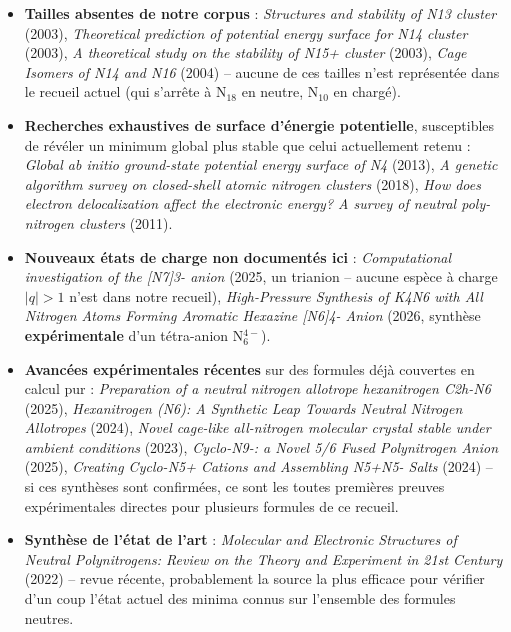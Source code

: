 \documentclass[11pt,a4paper]{article}
\begin{document}
\begin{itemize}
  \item \textbf{Tailles absentes de notre corpus} : \emph{Structures and
  stability of N13 cluster} (2003), \emph{Theoretical prediction of
  potential energy surface for N14 cluster} (2003), \emph{A theoretical
  study on the stability of N15+ cluster} (2003), \emph{Cage Isomers of
  N14 and N16} (2004) -- aucune de ces tailles n'est repr\'esent\'ee dans
  le recueil actuel (qui s'arr\^ete \`a N$_{18}$ en neutre, N$_{10}$ en
  charg\'e).
  \item \textbf{Recherches exhaustives de surface d'\'energie
  potentielle}, susceptibles de r\'ev\'eler un minimum global plus stable
  que celui actuellement retenu : \emph{Global ab initio ground-state
  potential energy surface of N4} (2013), \emph{A genetic algorithm survey
  on closed-shell atomic nitrogen clusters} (2018), \emph{How does electron
  delocalization affect the electronic energy? A survey of neutral
  poly-nitrogen clusters} (2011).
  \item \textbf{Nouveaux \'etats de charge non document\'es ici} :
  \emph{Computational investigation of the [N7]3- anion} (2025, un trianion
  --  aucune esp\`ece \`a charge $|q|>1$ n'est dans notre recueil),
  \emph{High-Pressure Synthesis of K4N6 with All Nitrogen Atoms Forming
  Aromatic Hexazine [N6]4- Anion} (2026, synth\`ese \textbf{exp\'erimentale}
  d'un t\'etra-anion N$_6^{4-}$).
  \item \textbf{Avanc\'ees exp\'erimentales r\'ecentes} sur des formules
  d\'ej\`a couvertes en calcul pur : \emph{Preparation of a neutral nitrogen
  allotrope hexanitrogen C2h-N6} (2025), \emph{Hexanitrogen (N6): A
  Synthetic Leap Towards Neutral Nitrogen Allotropes} (2024), \emph{Novel
  cage-like all-nitrogen molecular crystal stable under ambient conditions}
  (2023), \emph{Cyclo-N9-: a Novel 5/6 Fused Polynitrogen Anion} (2025),
  \emph{Creating Cyclo-N5+ Cations and Assembling N5+N5- Salts} (2024) --
  si ces synth\`eses sont confirm\'ees, ce sont les toutes premi\`eres
  preuves exp\'erimentales directes pour plusieurs formules de ce recueil.
  \item \textbf{Synth\`ese de l'\'etat de l'art} : \emph{Molecular and
  Electronic Structures of Neutral Polynitrogens: Review on the Theory and
  Experiment in 21st Century} (2022) -- revue r\'ecente, probablement la
  source la plus efficace pour v\'erifier d'un coup l'\'etat actuel des
  minima connus sur l'ensemble des formules neutres.
\end{itemize}
\end{document}
